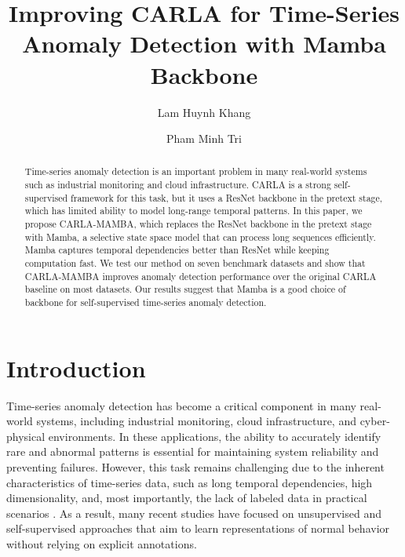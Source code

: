 \documentclass{svproc}
\begin{document}
\mainmatter              %

\title{Improving CARLA for Time-Series Anomaly Detection with Mamba Backbone}


\author{Lam Huynh Khang \and Pham Minh Tri}




\maketitle

\begin{abstract}
Time-series anomaly detection is an important problem in many real-world systems such as industrial monitoring and cloud infrastructure. CARLA is a strong self-supervised framework for this task, but it uses a ResNet backbone in the pretext stage, which has limited ability to model long-range temporal patterns. In this paper, we propose CARLA-MAMBA, which replaces the ResNet backbone in the pretext stage with Mamba, a selective state space model that can process long sequences efficiently. Mamba captures temporal dependencies better than ResNet while keeping computation fast. We test our method on seven benchmark datasets and show that CARLA-MAMBA improves anomaly detection performance over the original CARLA baseline on most datasets. Our results suggest that Mamba is a good choice of backbone for self-supervised time-series anomaly detection.
\end{abstract}

\section{Introduction}
\label{sec:introduction}

Time-series anomaly detection has become a critical component in many real-world systems, including industrial monitoring, cloud infrastructure, and cyber-physical environments. In these applications, the ability to accurately identify rare and abnormal patterns is essential for maintaining system reliability and preventing failures. However, this task remains challenging due to the inherent characteristics of time-series data, such as long temporal dependencies, high dimensionality, and, most importantly, the lack of labeled data in practical scenarios \cite{darban2022deep}. As a result, many recent studies have focused on unsupervised and self-supervised approaches that aim to learn representations of normal behavior without relying on explicit annotations.
\end{document}
